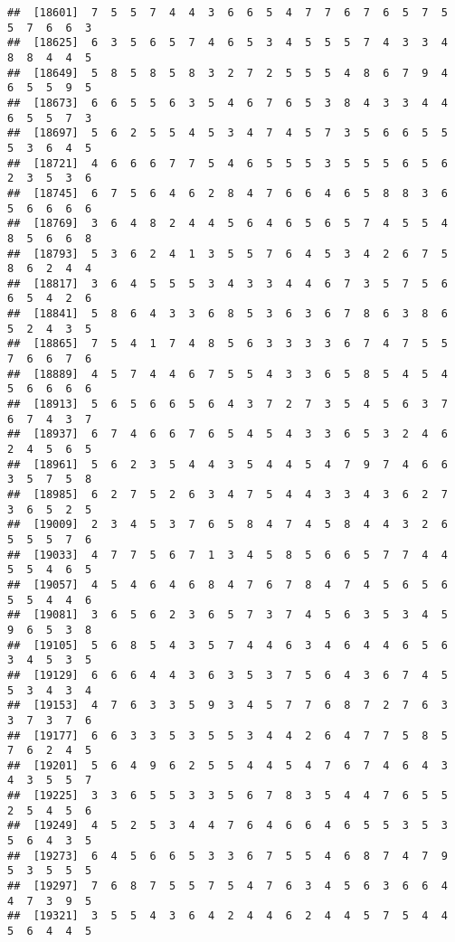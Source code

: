 \documentclass[
]{book}
\begin{document}
\begin{verbatim}
##  [18601]  7  5  5  7  4  4  3  6  6  5  4  7  7  6  7  6  5  7  5  5  7  6  6  3
##  [18625]  6  3  5  6  5  7  4  6  5  3  4  5  5  5  7  4  3  3  4  8  8  4  4  5
##  [18649]  5  8  5  8  5  8  3  2  7  2  5  5  5  4  8  6  7  9  4  6  5  5  9  5
##  [18673]  6  6  5  5  6  3  5  4  6  7  6  5  3  8  4  3  3  4  4  6  5  5  7  3
##  [18697]  5  6  2  5  5  4  5  3  4  7  4  5  7  3  5  6  6  5  5  5  3  6  4  5
##  [18721]  4  6  6  6  7  7  5  4  6  5  5  5  3  5  5  5  6  5  6  2  3  5  3  6
##  [18745]  6  7  5  6  4  6  2  8  4  7  6  6  4  6  5  8  8  3  6  5  6  6  6  6
##  [18769]  3  6  4  8  2  4  4  5  6  4  6  5  6  5  7  4  5  5  4  8  5  6  6  8
##  [18793]  5  3  6  2  4  1  3  5  5  7  6  4  5  3  4  2  6  7  5  8  6  2  4  4
##  [18817]  3  6  4  5  5  5  3  4  3  3  4  4  6  7  3  5  7  5  6  6  5  4  2  6
##  [18841]  5  8  6  4  3  3  6  8  5  3  6  3  6  7  8  6  3  8  6  5  2  4  3  5
##  [18865]  7  5  4  1  7  4  8  5  6  3  3  3  3  6  7  4  7  5  5  7  6  6  7  6
##  [18889]  4  5  7  4  4  6  7  5  5  4  3  3  6  5  8  5  4  5  4  5  6  6  6  6
##  [18913]  5  6  5  6  6  5  6  4  3  7  2  7  3  5  4  5  6  3  7  6  7  4  3  7
##  [18937]  6  7  4  6  6  7  6  5  4  5  4  3  3  6  5  3  2  4  6  2  4  5  6  5
##  [18961]  5  6  2  3  5  4  4  3  5  4  4  5  4  7  9  7  4  6  6  3  5  7  5  8
##  [18985]  6  2  7  5  2  6  3  4  7  5  4  4  3  3  4  3  6  2  7  3  6  5  2  5
##  [19009]  2  3  4  5  3  7  6  5  8  4  7  4  5  8  4  4  3  2  6  5  5  5  7  6
##  [19033]  4  7  7  5  6  7  1  3  4  5  8  5  6  6  5  7  7  4  4  5  5  4  6  5
##  [19057]  4  5  4  6  4  6  8  4  7  6  7  8  4  7  4  5  6  5  6  5  5  4  4  6
##  [19081]  3  6  5  6  2  3  6  5  7  3  7  4  5  6  3  5  3  4  5  9  6  5  3  8
##  [19105]  5  6  8  5  4  3  5  7  4  4  6  3  4  6  4  4  6  5  6  3  4  5  3  5
##  [19129]  6  6  6  4  4  3  6  3  5  3  7  5  6  4  3  6  7  4  5  5  3  4  3  4
##  [19153]  4  7  6  3  3  5  9  3  4  5  7  7  6  8  7  2  7  6  3  3  7  3  7  6
##  [19177]  6  6  3  3  5  3  5  5  3  4  4  2  6  4  7  7  5  8  5  7  6  2  4  5
##  [19201]  5  6  4  9  6  2  5  5  4  4  5  4  7  6  7  4  6  4  3  4  3  5  5  7
##  [19225]  3  3  6  5  5  3  3  5  6  7  8  3  5  4  4  7  6  5  5  2  5  4  5  6
##  [19249]  4  5  2  5  3  4  4  7  6  4  6  6  4  6  5  5  3  5  3  5  6  4  3  5
##  [19273]  6  4  5  6  6  5  3  3  6  7  5  5  4  6  8  7  4  7  9  5  3  5  5  5
##  [19297]  7  6  8  7  5  5  7  5  4  7  6  3  4  5  6  3  6  6  4  4  7  3  9  5
##  [19321]  3  5  5  4  3  6  4  2  4  4  6  2  4  4  5  7  5  4  4  5  6  4  4  5

\end{verbatim}
\end{document}
